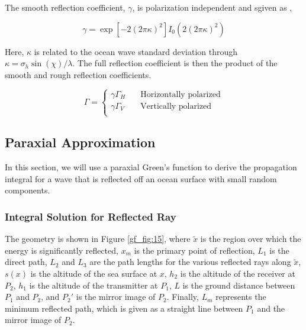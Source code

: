 The smooth reflection coefficient, $\gamma$, is polarization independent and sgiven as \cite{miller_reflection}, \cite{lohrmann_rcs}

\begin{equation}
\gamma = \exp\left[-2(2\pi \kappa)^2 \right]I_0\left(2(2\pi \kappa)^2 \right)
\label{gf_mb:4}
\end{equation}
\renewcommand{\baselinestretch}{2} \small\normalsize

Here, $\kappa$ is related to the ocean wave standard deviation through $\kappa = \sigma_h \sin(\chi)/\lambda$. The full reflection coefficient is then the product of the smooth and rough reflection coefficients.

\begin{equation}
\Gamma =
  \begin{cases}
    \gamma\Gamma_H       & \quad \text{Horizontally polarized}\\
    \gamma\Gamma_V & \quad \text{Vertically polarized}\\
  \end{cases}
\label{gf_mb:5}
\end{equation}
\renewcommand{\baselinestretch}{2} \small\normalsize

\subsection{Paraxial Approximation}\label{paraxial_diffraction}
In this section, we will use a paraxial Green's function to derive the propagation integral for a wave that is reflected off an ocean surface with small random components.

\subsubsection{Integral Solution for Reflected Ray}
 The geometry is shown in Figure \ref{gf_fig:15}, where $\tilde{x}$ is the region over which the energy is significantly reflected, $x_m$ is the primary point of reflection, $L_1$ is the direct path, $L_2$ and $L_3$ are the path lengths for the various reflected rays along $\tilde{x}$, $s(x)$ is the altitude of the sea surface at $x$, $h_2$ is the altitude of the receiver at $P_2$, $h_1$ is the altitude of the transmitter at $P_1$, $L$ is the ground distance between $P_1$ and $P_2$, and $P_2'$ is the mirror image of $P_2$. Finally, $L_m$ represents the minimum reflected path, which is given as a straight line between $P_1$ and the mirror image of $P_2$. 

